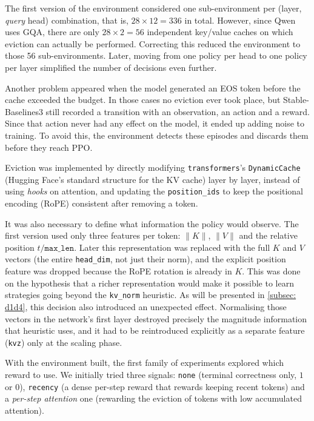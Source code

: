 The first version of the environment considered one sub-environment per (layer, \textit{query} head) combination, that is, $28\times12=336$ in total. However, since Qwen uses GQA, there are only $28\times2=56$ independent key/value caches on which eviction can actually be performed. Correcting this reduced the environment to those 56 sub-environments. Later, moving from one policy per head to one policy per layer simplified the number of decisions even further.

Another problem appeared when the model generated an EOS token before the cache exceeded the budget. In those cases no eviction ever took place, but Stable-Baselines3 still recorded a transition with an observation, an action and a reward. Since that action never had any effect on the model, it ended up adding noise to training. To avoid this, the environment detects these episodes and discards them before they reach PPO.

Eviction was implemented by directly modifying \texttt{transformers}'s \texttt{DynamicCache} (Hugging Face's standard structure for the KV cache) layer by layer, instead of using \textit{hooks} on attention, and updating the \texttt{position\_ids} to keep the positional encoding (RoPE) consistent after removing a token.

It was also necessary to define what information the policy would observe. The first version used only three features per token: $\|K\|$, $\|V\|$ and the relative position $t/\texttt{max\_len}$. Later this representation was replaced with the full $K$ and $V$ vectors (the entire \texttt{head\_dim}, not just their norm), and the explicit position feature was dropped because the RoPE rotation is already in $K$.
This was done on the hypothesis that a richer representation would make it possible to learn strategies going beyond the \texttt{kv\_norm} heuristic. As will be presented in \cref{subsec: d1d4}, this decision also introduced an unexpected effect. Normalising those vectors in the network's first layer destroyed precisely the magnitude information that heuristic uses, and it had to be reintroduced explicitly as a separate feature (\texttt{kvz}) only at the scaling phase.

With the environment built, the first family of experiments explored which reward to use. We initially tried three signals: \texttt{none} (terminal correctness only, $1$ or $0$), \texttt{recency} (a dense per-step reward that rewards keeping recent tokens) and a \emph{per-step attention} one (rewarding the eviction of tokens with low accumulated attention).

